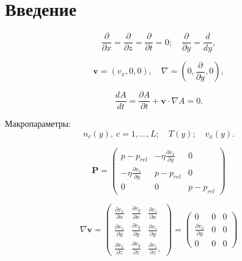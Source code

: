 \documentclass[12pt]{article}
\begin{document}
\section{Введение}
\begin{equation}
  \frac{\partial}{\partial x} = \frac{\partial}{\partial z} = \frac{\partial}{\partial t} = 0; \quad \frac{\partial}{\partial y} = \frac{d}{d y},
\end{equation}

\begin{equation}
  \mathbf{v} = (v_{x}, 0, 0),\quad \nabla=\left(0, \frac{\partial}{\partial y}, 0 \right),
\end{equation}

\begin{equation}
  \frac{d A}{d t} = \frac{\partial A}{\partial t} + \mathbf{v} \cdot \nabla A = 0.
\end{equation}

Макропараметры:
\begin{equation}
  n_{c}(y),\:c=1,\ldots,L;\quad T(y);\quad v_{x}(y).
\end{equation}


\begin{equation}
  \mathbf{P} =
  \begin{pmatrix}
  p - p_{rel} & -\eta \frac{\partial v_{x}}{\partial y} & 0 \\
  -\eta \frac{\partial v_{x}}{\partial y} & p - p_{rel} & 0 \\
  0 & 0 & p - p_{rel}
  \end{pmatrix}
\end{equation}

\begin{equation}
  \nabla \mathbf{v} =
  \begin{pmatrix}
  \frac{\partial v_{x}}{\partial x} & \frac{\partial v_{y}}{\partial x} & \frac{\partial v_{z}}{\partial x} \\
  \frac{\partial v_{x}}{\partial y} & \frac{\partial v_{y}}{\partial y} & \frac{\partial v_{z}}{\partial y} \\
  \frac{\partial v_{x}}{\partial z} & \frac{\partial v_{y}}{\partial z} & \frac{\partial v_{z}}{\partial z},
  \end{pmatrix}
  =
  \begin{pmatrix}
  0 & 0 & 0 \\
  \frac{\partial v_{x}}{\partial y} & 0 & 0 \\
  0 & 0 & 0
  \end{pmatrix}
\end{equation}
\end{document}
